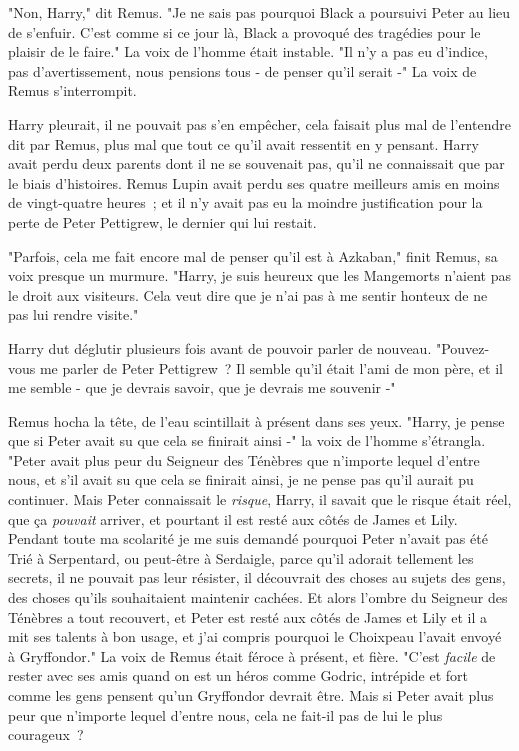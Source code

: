 \later

"Non, Harry," dit Remus. "Je ne sais pas pourquoi Black a poursuivi Peter au lieu de s'enfuir. C'est comme si ce jour là, Black a provoqué des tragédies pour le plaisir de le faire." La voix de l'homme était instable. "Il n'y a pas eu d'indice, pas d'avertissement, nous pensions tous - de penser qu'il serait -" La voix de Remus s'interrompit.

Harry pleurait, il ne pouvait pas s'en empêcher, cela faisait plus mal de l'entendre dit par Remus, plus mal que tout ce qu'il avait ressentit en y pensant. Harry avait perdu deux parents dont il ne se souvenait pas, qu'il ne connaissait que par le biais d'histoires. Remus Lupin avait perdu ses quatre meilleurs amis en moins de vingt-quatre heures~; et il n'y avait pas eu la moindre justification pour la perte de Peter Pettigrew, le dernier qui lui restait.

"Parfois, cela me fait encore mal de penser qu'il est à Azkaban," finit Remus, sa voix presque un murmure. "Harry, je suis heureux que les Mangemorts n'aient pas le droit aux visiteurs. Cela veut dire que je n'ai pas à me sentir honteux de ne pas lui rendre visite."

Harry dut déglutir plusieurs fois avant de pouvoir parler de nouveau. "Pouvez-vous me parler de Peter Pettigrew~? Il semble qu'il était l'ami de mon père, et il me semble - que je devrais savoir, que je devrais me souvenir -"

Remus hocha la tête, de l'eau scintillait à présent dans ses yeux. "Harry, je pense que si Peter avait su que cela se finirait ainsi -" la voix de l'homme s'étrangla. "Peter avait plus peur du Seigneur des Ténèbres que n'importe lequel d'entre nous, et s'il avait su que cela se finirait ainsi, je ne pense pas qu'il aurait pu continuer. Mais Peter connaissait le \emph{risque}, Harry, il savait que le risque était réel, que ça \emph{pouvait} arriver, et pourtant il est resté aux côtés de James et Lily. Pendant toute ma scolarité je me suis demandé pourquoi Peter n'avait pas été Trié à Serpentard, ou peut-être à Serdaigle, parce qu'il adorait tellement les secrets, il ne pouvait pas leur résister, il découvrait des choses au sujets des gens, des choses qu'ils souhaitaient maintenir cachées. Et alors l'ombre du Seigneur des Ténèbres a tout recouvert, et Peter est resté aux côtés de James et Lily et il a mit ses talents à bon usage, et j'ai compris pourquoi le Choixpeau l'avait envoyé à Gryffondor." La voix de Remus était féroce à présent, et fière. "C'est \emph{facile} de rester avec ses amis quand on est un héros comme Godric, intrépide et fort comme les gens pensent qu'un Gryffondor devrait être. Mais si Peter avait plus peur que n'importe lequel d'entre nous, cela ne fait-il pas de lui le plus courageux~?

